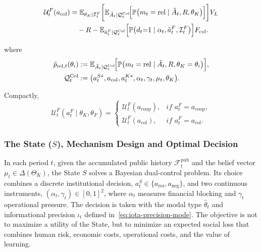 \documentclass[12pt,a4paper]{article}
\theoremstyle{plain}
\theoremstyle{definition}
\theoremstyle{remark}
\newcommand{\ProbE}{\mathbb{P}}
\newcommand{\E}{\mathbb{E}}
\newcommand{\1}{\mathbf{1}}
\newcommand{\QtinfoF}{\mathcal{Q}_{t}^{\mathrm{Col}}}
\begin{document}
\begin{equation}
    \label{eq:family-utility-col}
    \begin{split}
    \mathcal{U}^F_t(a_{\mathrm{col}})
    &=
    \E_{\theta_K \mid \mathcal{I}_t^F}
    \biggl[
    \E_{\tilde A_t \mid \mathcal Q_t^{\mathrm{Col}}}\!\Bigl[
      \ProbE\bigl(m_t=\mathrm{rel}\mid \tilde A_t,R,\theta_K\bigr)
    \Bigr]
    \biggr] V_L \\
    &\quad - R
    -\E_{\tilde{a}_t^F\mid\QtinfoF}\Bigl[
    \ProbE\bigl(d_t{=}1\mid\alpha_t,\tilde{a}_t^F,\mathcal{I}_t^F\bigr)
    \Bigr]F_{\mathrm{col}}.
    \end{split}
\end{equation}

\noindent where
\[
\begin{aligned}
\tilde p_{\mathrm{rel},t}(\theta_i)
&:=
\E_{\tilde A_t \mid \mathcal Q_t^{\mathrm{Col}}}\!\Bigl[
\ProbE\bigl(m_t=\mathrm{rel}\mid \tilde A_t,R,\theta_K=\theta_i\bigr)
\Bigr], \\
\mathcal Q_t^{\mathrm{Col}}
&:=
\bigl(a_t^{S\ast},a_{\mathrm{col}},a_t^{K\ast},\alpha_t,\gamma_t,\mu_t,\theta_K\bigr).
\end{aligned}
\]

\noindent Compactly,
\begin{equation}
\label{eq:family-utility-general}
\mathcal{U}^F_t(a_t^F \mid \theta_K,\theta_F)
=
\begin{cases}
\mathcal{U}^F_t(a_{\mathrm{coop}}), & \textit{if } a_t^F = a_{\mathrm{coop}},\\
\mathcal{U}^F_t(a_{\mathrm{col}}), & \textit{if } a_t^F = a_{\mathrm{col}}.
\end{cases}
\end{equation}

\subsubsection[The State S]{The State ($S$), Mechanism Design and Optimal Decision}
\label{sec:state-mechanism}

In each period $t$, given the accumulated public history $\mathcal{F}_t^{\mathrm{pub}}$ and the belief vector $\mu_t\in\Delta(\Theta_K)$, the State $S$ solves a Bayesian dual-control problem. Its choice combines a discrete institutional decision,
$a_t^S\in\{a_{\mathrm{res}},a_{\mathrm{neg}}\}$, and two continuous instruments, $(\alpha_t,\gamma_t)\in[0,1]^2$, where $\alpha_t$ measures financial blocking and $\gamma_t$ operational pressure. The decision is taken with the modal type $\hat{\theta}_t$ and informational precision $\iota_t$ defined in~\eqref{eq:iota-precision-mode}. The objective is not to maximize a utility of the State, but to minimize an expected social loss that combines human risk, economic costs, operational costs, and the value of learning.
\end{document}
